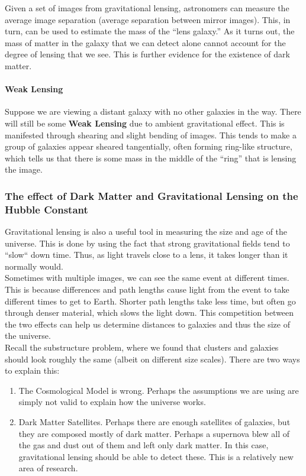 \documentclass{article}
\begin{document}
	\noindent Given a set of images from gravitational lensing, astronomers can measure the average image separation (average separation between mirror images). This, in turn, can be used to estimate the mass of the ``lens galaxy.'' As it turns out, the mass of matter in the galaxy that we can detect alone cannot account for the degree of lensing that we see. This is further evidence for the existence of dark matter.
	
	\paragraph{Weak Lensing} Suppose we are viewing a distant galaxy with no other galaxies in the way. There will still be some \textbf{Weak Lensing} due to ambient gravitational effect. This is manifested through shearing and slight bending of images. This tends to make a group of galaxies appear sheared tangentially, often forming ring-like structure, which tells us that there is some mass in the middle of the ``ring'' that is lensing the image.
	\subsubsection{The effect of Dark Matter and Gravitational Lensing on the Hubble Constant}
	Gravitational lensing is also a useful tool in measuring the size and age of the universe. This is done by using the fact that strong gravitational fields tend to ``slow`` down time. Thus, as light travels close to a lens, it takes longer than it normally would.\\
	
	\noindent Sometimes with multiple images, we can see the same event at different times. This is because differences and path lengths cause light from the event to take different times to get to Earth. Shorter path lengths take less time, but often go through denser material, which slows the light down. This competition between the two effects can help us determine distances to galaxies and thus the size of the universe.\\
	
	\noindent Recall the substructure problem, where we found that clusters and galaxies should look roughly the same (albeit on different size scales). There are two ways to explain this:
	\begin{enumerate}
		\item The Cosmological Model is wrong. Perhaps the assumptions we are using are simply not valid to explain how the universe works.
		\item Dark Matter Satellites. Perhaps there are enough satellites of galaxies, but they are composed mostly of dark matter. Perhaps a supernova blew all of the gas and dust out of them and left only dark matter. In this case, gravitational lensing should be able to detect these. This is a relatively new area of research.
	\end{enumerate}
\end{document}
